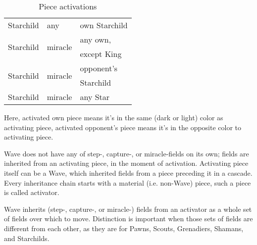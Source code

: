 \begin{table}[!h]
\begin{tabular}{ lll }
\cmidrule{1-3} %
Starchild                               & any                           & own Starchild                 \\
\cmidrule{1-3} %
\multirow{2}{*}{Starchild}              & \multirow{2}{*}{miracle}      & any own,                      \\
                                        &                               & except King                   \\
\cmidrule{1-3} %
\multirow{2}{*}{Starchild}              & \multirow{2}{*}{miracle}      & opponent's                    \\
                                        &                               & Starchild                     \\
\cmidrule{1-3} %
Starchild                               & miracle                       & any Star                      \\
\bottomrule %
\end{tabular}
\caption{Piece activations}
\label{tbl:Appendix/Summary/Piece activations}
\end{table}


Here, activated own piece means it's in the same (dark or light) color as
activating piece, activated opponent's piece means it's in the opposite color
to activating piece.

Wave does not have any of step-, capture-, or miracle-fields on its own; fields
are inherited from an activating piece, in the moment of activation. Activating
piece itself can be a Wave, which inherited fields from a piece preceding it in
a cascade. Every inheritance chain starts with a material (i.e. non-Wave) piece,
such a piece is called activator.

Wave inherits (step-, capture-, or miracle-) fields from an activator as a whole
set of fields over which to move. Distinction is important when those sets of
fields are different from each other, as they are for Pawns, Scouts, Grenadiers,
Shamans, and Starchilds.

